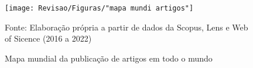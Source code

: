 \begin{figure}[H]
	\centering
	\caption{Mapa mundial da publicação de artigos em todo o mundo}
	\label{fig:mapa-mundi-artigos}
	\texttt{[image: Revisao/Figuras/"mapa mundi artigos"]}
	\vspace{0.2cm}
	
	Fonte: Elaboração própria a partir de dados da Scopus, Lens e Web of Sicence (2016 a 2022)
\end{figure}